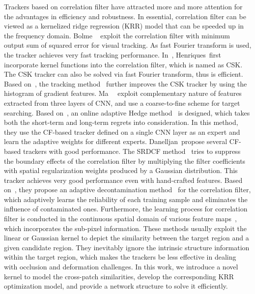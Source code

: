 \documentclass[10pt,twocolumn,letterpaper]{article}
\begin{document}
Trackers based on correlation filter have attracted more and more attention for
the advantages in efficiency and robustness. In essential, correlation filter can
be viewed as a kernelized ridge regression (KRR) model that can be speeded up in
the frequency domain.
Bolme \etal~\cite{bolme2010visual} exploit the correlation filter with minimum
output sum of squared error for visual tracking. As fast Fourier transform is used,
the tracker achieves very fast tracking performance.
In~\cite{henriques2012exploiting}, Henriques~\etal first incorporate kernel functions
into the correlation filter, which is named as CSK. The CSK tracker can also be solved
via fast Fourier transform, thus is efficient.
Based on~\cite{henriques2012exploiting}, the tracking method~\cite{henriques2015high}
further improves the CSK tracker by using the histogram of gradient features.
Ma~\etal~\cite{ma2015hierarchical} exploit complementary nature of features extracted
from three layers of CNN, and use a coarse-to-fine scheme for target searching.
Based on~\cite{ma2015hierarchical}, an online adaptive Hedge method~\cite{qi2016hedged}
is designed, which takes both the short-term and long-term regrets into consideration.
In this method, they use the CF-based tracker defined on a single CNN layer as an expert
and learn the adaptive weights for different experts.
Danelljan~\etal propose several CF-based trackers with good performance.
The SRDCF method~\cite{danelljan2015learning} tries to suppress the boundary
effects of the correlation filter by multiplying the filter coefficients with
spatial regularization weights produced by a Gaussian distribution.
This tracker achieves very good performance even with hand-crafted features.
Based on~\cite{danelljan2015learning}, they propose an adaptive decontamination
method~\cite{danelljan2016adaptive} for the correlation filter, which adaptively
learns the reliability of each training sample and eliminates the influence of
contaminated ones.
Furthermore, the learning process for correlation filter is conducted in the
continuous spatial domain of various feature maps~\cite{danelljan2016beyond},
which incorporates the sub-pixel information.
These methods usually exploit the linear or Gaussian kernel to depict the
similarity between the target region and a given candidate region.
They inevitably ignore the intrinsic structure information within the target
region, which makes the trackers be less effective in dealing with occlusion
and deformation challenges.
In this work, we introduce a novel kernel to model the cross-patch similarities,
develop the corresponding KRR optimization model, and provide a network structure
to solve it efficiently.
\end{document}
